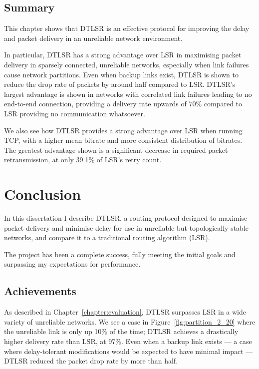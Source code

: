 \documentclass[withindex,glossary,openany]{cam-thesis}
\begin{document}
\section{Summary}

This chapter shows that DTLSR is an effective protocol for improving the delay and packet delivery in an unreliable network environment.

In particular, DTLSR has a strong advantage over LSR in maximising packet delivery in sparsely connected, unreliable networks, especially when link failures cause network partitions. Even when backup links exist, DTLSR is shown to reduce the drop rate of packets by around half compared to LSR. DTLSR's largest advantage is shown in networks with correlated link failures leading to no end-to-end connection, providing a delivery rate upwards of 70\% compared to LSR providing no communication whatsoever.

We also see how DTLSR provides a strong advantage over LSR when running TCP, with a higher mean bitrate and more consistent distribution of bitrates. The greatest advantage shown is a significant decrease in required packet retransmission, at only 39.1\% of LSR's retry count.

\chapter{Conclusion}

In this dissertation I describe DTLSR, a routing protocol designed to maximise packet delivery and minimise delay for use in unreliable but topologically stable networks, and compare it to a traditional routing algorithm (LSR).

The project has been a complete success, fully meeting the initial goals and surpassing my expectations for performance.

\section{Achievements}

As described in Chapter~\ref{chapter:evaluation}, DTLSR surpasses LSR in a wide variety of unreliable networks. We see a case in Figure~\ref{fig:partition_2_20} where the unreliable link is only up 10\% of the time; DTLSR achieves a drastically higher delivery rate than LSR, at 97\%. Even when a backup link exists --- a case where delay-tolerant modifications would be expected to have minimal impact --- DTLSR reduced the packet drop rate by more than half.
\end{document}
